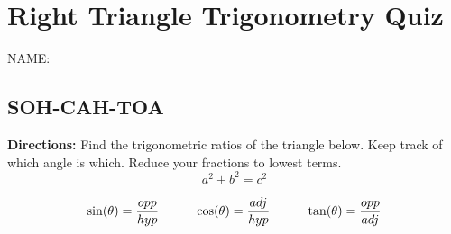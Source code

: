 \documentclass[12pt]{article}
\begin{document}
\section*{Right Triangle Trigonometry Quiz}

\vspace{12pt}

 \hfill NAME:\underline{\hspace{3in}}\\
 


\subsection*{SOH-CAH-TOA}

\textbf{Directions:} Find the trigonometric ratios of the triangle below. Keep track of which angle is which. Reduce your fractions to lowest terms.\\

$$a^2+b^2=c^2$$

$$\sin(\theta)=\dfrac{opp}{hyp} \hspace{1cm} \cos(\theta)=\dfrac{adj}{hyp} \hspace*{1cm} \tan(\theta)=\dfrac{opp}{adj}$$
\begin{center}
\end{center}
\end{document}
